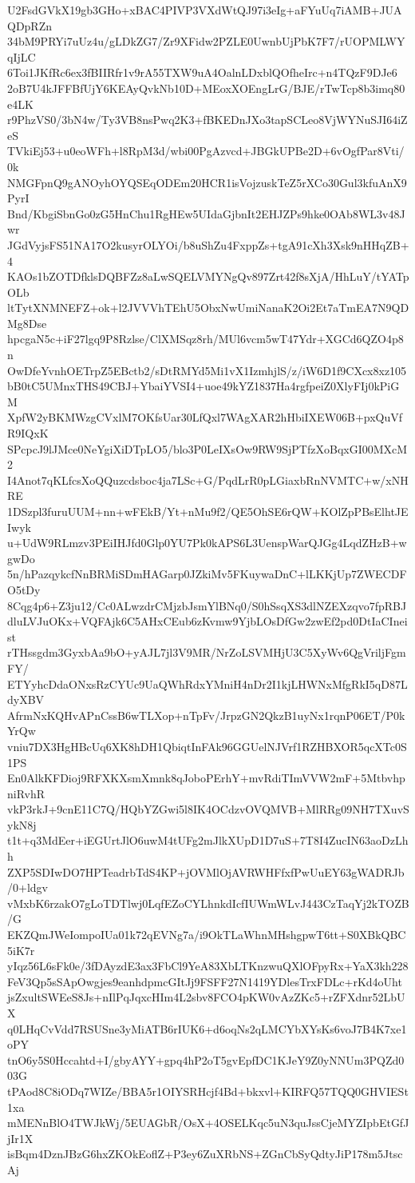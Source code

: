 U2FsdGVkX19gb3GHo+xBAC4PIVP3VXdWtQJ97i3eIg+aFYuUq7iAMB+JUAQDpRZn
34bM9PRYi7uUz4u/gLDkZG7/Zr9XFidw2PZLE0UwnbUjPbK7F7/rUOPMLWYqIjLC
6Toi1JKfRc6ex3fBIIRfr1v9rA55TXW9uA4OalnLDxblQOfheIrc+n4TQzF9DJe6
2oB7U4kJFFBfUjY6KEAyQvkNb10D+MEoxXOEngLrG/BJE/rTwTcp8b3imq80e4LK
r9PhzVS0/3bN4w/Ty3VB8nsPwq2K3+fBKEDnJXo3tapSCLeo8VjWYNuSJI64iZeS
TVkiEj53+u0eoWFh+l8RpM3d/wbi00PgAzvcd+JBGkUPBe2D+6vOgfPar8Vti/0k
NMGFpnQ9gANOyhOYQSEqODEm20HCR1isVojzuskTeZ5rXCo30Gul3kfuAnX9PyrI
Bnd/KbgiSbnGo0zG5HnChu1RgHEw5UIdaGjbnIt2EHJZPs9hke0OAb8WL3v48Jwr
JGdVyjsFS51NA17O2kusyrOLYOi/b8uShZu4FxppZs+tgA91cXh3Xsk9nHHqZB+4
KAOs1bZOTDfklsDQBFZz8aLwSQELVMYNgQv897Zrt42f8sXjA/HhLuY/tYATpOLb
ltTytXNMNEFZ+ok+l2JVVVhTEhU5ObxNwUmiNanaK2Oi2Et7aTmEA7N9QDMg8Dse
hpcgaN5c+iF27lgq9P8Rzlse/ClXMSqz8rh/MUl6vcm5wT47Ydr+XGCd6QZO4p8n
OwDfeYvnhOETrpZ5EBctb2/sDtRMYd5Mi1vX1IzmhjlS/z/iW6D1f9CXcx8xz105
bB0tC5UMnxTHS49CBJ+YbaiYVSI4+uoe49kYZ1837Ha4rgfpeiZ0XlyFIj0kPiGM
XpfW2yBKMWzgCVxlM7OKfsUar30LfQxl7WAgXAR2hHbiIXEW06B+pxQuVfR9IQxK
SPcpcJ9lJMce0NeYgiXiDTpLO5/blo3P0LeIXsOw9RW9SjPTfzXoBqxGI00MXcM2
I4Anot7qKLfcsXoQQuzcdsboc4ja7LSc+G/PqdLrR0pLGiaxbRnNVMTC+w/xNHRE
1DSzpl3furuUUM+nn+wFEkB/Yt+nMu9f2/QE5OhSE6rQW+KOlZpPBsElhtJEIwyk
u+UdW9RLmzv3PEiIHJfd0Glp0YU7Pk0kAPS6L3UenspWarQJGg4LqdZHzB+wgwDo
5n/hPazqykcfNnBRMiSDmHAGarp0JZkiMv5FKuywaDnC+lLKKjUp7ZWECDFO5tDy
8Cqg4p6+Z3ju12/Cc0ALwzdrCMjzbJsmYlBNq0/S0hSsqXS3dlNZEXzqvo7fpRBJ
dluLVJuOKx+VQFAjk6C5AHxCEub6zKvmw9YjbLOsDfGw2zwEf2pd0DtIaCIneist
rTHssgdm3GyxbAa9bO+yAJL7jl3V9MR/NrZoLSVMHjU3C5XyWv6QgVriljFgmFY/
ETYyhcDdaONxsRzCYUc9UaQWhRdxYMniH4nDr2I1kjLHWNxMfgRkI5qD87LdyXBV
AfrmNxKQHvAPnCssB6wTLXop+nTpFv/JrpzGN2QkzB1uyNx1rqnP06ET/P0kYrQw
vniu7DX3HgHBcUq6XK8hDH1QbiqtInFAk96GGUelNJVrf1RZHBXOR5qcXTc0S1PS
En0AlkKFDioj9RFXKXsmXmnk8qJoboPErhY+mvRdiTImVVW2mF+5MtbvhpniRvhR
vkP3rkJ+9cnE11C7Q/HQbYZGwi5l8IK4OCdzvOVQMVB+MlRRg09NH7TXuvSykN8j
t1t+q3MdEer+iEGUrtJlO6uwM4tUFg2mJlkXUpD1D7uS+7T8I4ZucIN63aoDzLhh
ZXP5SDIwDO7HPTeadrbTdS4KP+jOVMlOjAVRWHFfxfPwUuEY63gWADRJb/0+ldgv
vMxbK6rzakO7gLoTDTlwj0LqfEZoCYLhnkdIcfIUWmWLvJ443CzTaqYj2kTOZB/G
EKZQmJWeIompoIUa01k72qEVNg7a/i9OkTLaWhnMHshgpwT6tt+S0XBkQBC5iK7r
yIqz56L6sFk0e/3fDAyzdE3ax3FbCl9YeA83XbLTKnzwuQXlOFpyRx+YaX3kh228
FeV3Qp5sSApOwgjes9eanhdpmcGItJj9FSFF27N1419YDlesTrxFDLc+rKd4oUht
jsZxultSWEeS8Js+nIlPqJqxcHIm4L2sbv8FCO4pKW0vAzZKc5+rZFXdnr52LbUX
q0LHqCvVdd7RSUSne3yMiATB6rIUK6+d6oqNs2qLMCYbXYsKs6voJ7B4K7xe1oPY
tnO6y5S0Hccahtd+I/gbyAYY+gpq4hP2oT5gvEpfDC1KJeY9Z0yNNUm3PQZd003G
tPAod8C8iODq7WIZe/BBA5r1OIYSRHcjf4Bd+bkxvl+KIRFQ57TQQ0GHVIESt1xa
mMENnBlO4TWJkWj/5EUAGbR/OsX+4OSELKqc5uN3quJssCjeMYZIpbEtGfJjIr1X
isBqm4DznJBzG6hxZKOkEoflZ+P3ey6ZuXRbNS+ZGnCbSyQdtyJiP178m5JtscAj
